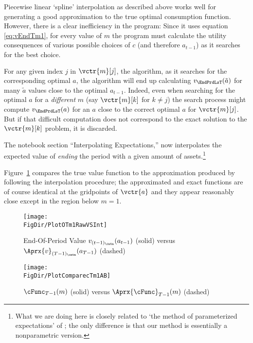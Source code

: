 Piecewise linear `spline' interpolation as described above works well for generating a good approximation to the true optimal consumption function. However, there is a clear inefficiency in the program: Since it uses equation \eqref{eq:vEndTm1}, for every value of $m$ the program must calculate the utility consequences of various possible choices of $c$ (and therefore $a_{t-1}$) as it searches for the best choice.

For any given index $j$ in $\vctr{m}[j]$, the algorithm, as it searches for the corresponding optimal $a$, the algorithm will end up  calculating $v_{\EndPrdLsT}(\tilde{a})$ for many $\tilde{a}$ values close to the optimal $a_{t-1}$.  Indeed, even when searching for the optimal $a$ for a \emph{different} $m$ (say $\vctr{m}[k]$ for $k \neq j$) the search process might compute $v_{\EndPrdLsT}(a)$ for an $a$ close to the correct optimal $a$ for $\vctr{m}[j]$. But if that difficult computation does not correspond to the exact solution to the $\vctr{m}[k]$ problem, it is discarded.  


The notebook section ``Interpolating Expectations,'' now interpolates the expected value of \textit{ending} the period with a given amount of assets.\footnote{What we are doing here is closely related to `the method of parameterized expectations' of \cite{denHaanMarcet:parameterized}; the only difference is that our method is essentially a nonparametric version.}  %

Figure~\ref{fig:PlotOTm1RawVSInt} compares the true value function to the approximation produced by following the interpolation procedure; the approximated and exact functions are of course identical at the gridpoints of $\vctr{a}$ and they appear reasonably close except in the region below $m=1$.

\hypertarget{PlotOTm1RawVSInt}{}
\begin{figure}
  \centerline{\texttt{[image: \\FigDir/PlotOTm1RawVSInt]}}
  \caption{End-Of-Period Value $v_{(t-1)_\cntn}(a_{t-1})$ (solid) versus $\Aprx{v}_{({T-1})_\cntn}(a_{T-1})$ (dashed)}
  \label{fig:PlotOTm1RawVSInt}
\end{figure}

\hypertarget{PlotComparecTm1AB}{}
\begin{figure}
  \centerline{\texttt{[image: \\FigDir/PlotComparecTm1AB]}}
  \caption{$\cFunc_{T-1}(m)$ (solid) versus $\Aprx{\cFunc}_{T-1}(m)$ (dashed)}
  \label{fig:PlotComparecTm1AB}
\end{figure}

